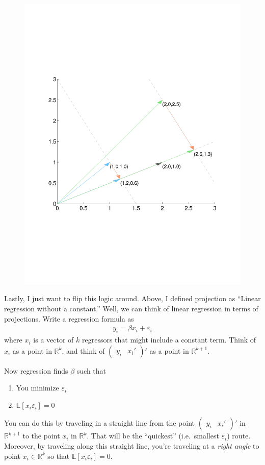 \documentclass[12pt]{article}
\theoremstyle{plain}
\theoremstyle{definition}
\theoremstyle{remark}
\begin{document}
\begin{figure}[htpb!]
  \centering
  \includegraphics[scale=0.6, trim={2cm, 7cm, 2cm, 7cm}, clip]{Plots/StateSpaceGeometry6.pdf}
\end{figure}

Lastly, I just want to flip this logic around. Above, I defined
projection as ``Linear regression without a constant.'' Well, we can
think of linear regression in terms of projections. Write a regression
formula as
\begin{align*}
  y_i = \beta x_i + \varepsilon_i
\end{align*}
where $x_i$ is a vector of $k$ regressors that might include a constant
term. Think of $x_i$ as a point in $\mathbb{R}^k$, and think of
$\begin{pmatrix}y_i & x_i'\end{pmatrix}'$ as a point in
$\mathbb{R}^{k+1}$.

Now regression finds $\beta$ such that
\begin{enumerate}
  \item You minimize $\varepsilon_i$
  \item $\mathbb{E}[x_i\varepsilon_i]=0$
\end{enumerate}
You can do this by traveling in a straight line from the point
$\begin{pmatrix}y_i & x_i'\end{pmatrix}'$ in $\mathbb{R}^{k+1}$ to the
point $x_i$ in $\mathbb{R}^k$. That will be the ``quickest'' (i.e.\
smallest $\varepsilon_i$) route. Moreover, by traveling along this
straight line, you're traveling at a \emph{right angle} to point $x_i
\in \mathbb{R}^k$ so that $\mathbb{E}[x_i\varepsilon_i]=0$.
\end{document}
